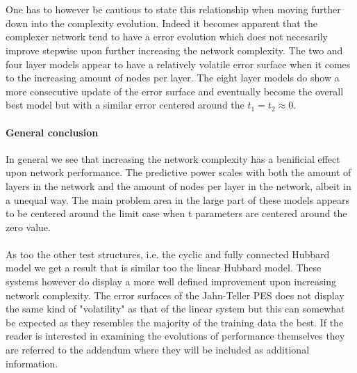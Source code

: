 \documentclass[]{article}
\begin{document}
\\
\\
One has to however be cautious to state this relationship when moving further down into the complexity evolution. Indeed it becomes apparent that the complexer network tend to have a error evolution which does not necesarily improve stepwise upon further increasing the network complexity. The two and four layer models appear to have a relatively volatile error surface when it comes to the increasing amount of nodes per layer. The eight layer models do show a more consecutive update of the error surface and eventually become the overall best model but with a similar error centered around the $t_1=t_2\approx0$. 

\paragraph{General conclusion} 
In general we see that increasing the network complexity has a benificial effect upon network performance. The predictive power scales with both the amount of layers in the network and the amount of nodes per layer in the network, albeit in a unequal way. The main problem area in the large part of these models appears to be centered around the limit case when t parameters are centered around the zero value. 
\\
\\
As too the other test structures, i.e. the cyclic and fully connected Hubbard model we get a result that is similar too the linear Hubbard model. These systems however do display a more well defined improvement upon increasing network complexity. The error surfaces of the Jahn-Teller PES does not display the same kind of "volatility" as that of the linear system but this can somewhat be expected as they resembles the majority of the training data the best. If the reader is interested in examining the evolutions of performance themselves they are referred to the addendum where they will be included as additional information.
\newpage
{}
\thispagestyle{empty}
\end{document}
